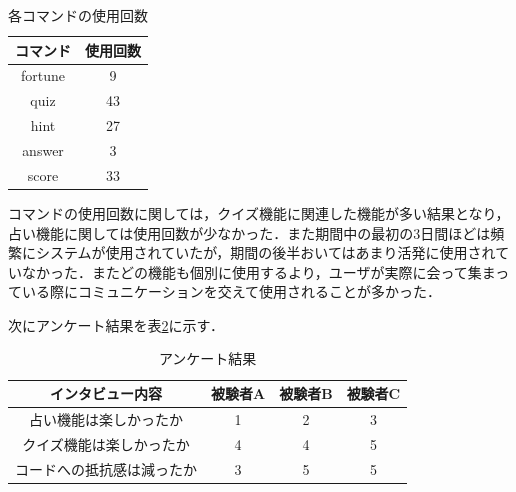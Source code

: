 \begin{table}[h]
  \centering
  \caption{各コマンドの使用回数}
  \label{command}
    \begin{tabular}{|c|c|} \hline
      コマンド & 使用回数 \\ \hline \hline
      fortune & 9 \\ \hline
      quiz & 43 \\ \hline
      hint & 27 \\ \hline
      answer & 3 \\ \hline
      score & 33 \\ \hline
    \end{tabular}
\end{table}

コマンドの使用回数に関しては，クイズ機能に関連した機能が多い結果となり，占い機能に関しては使用回数が少なかった．また期間中の最初の3日間ほどは頻繁にシステムが使用されていたが，期間の後半おいてはあまり活発に使用されていなかった．またどの機能も個別に使用するより，ユーザが実際に会って集まっている際にコミュニケーションを交えて使用されることが多かった．

次にアンケート結果を表\ref{interview}に示す．
\begin{table}[h]
  \centering
  \caption{アンケート結果}
  \label{interview}
    \begin{tabular}{|c|c|c|c|} \hline
      インタビュー内容 & 被験者A & 被験者B & 被験者C \\ \hline \hline
      占い機能は楽しかったか & 1 & 2 & 3 \\ \hline
      クイズ機能は楽しかったか & 4 & 4 & 5 \\ \hline
      コードへの抵抗感は減ったか & 3 & 5 &5 \\ \hline
    \end{tabular}
\end{table}

